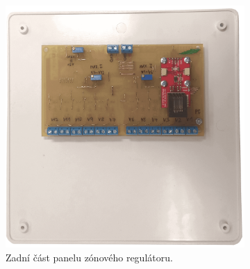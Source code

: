 


\begin{figure}[H]
\centering
\begin{subfigure}{.5\textwidth}
  \centering
  \includegraphics[width=\textwidth]{images/zonovy-regulator/zonovy-regulator-spodni-strana.png}
  \caption{Zadní část panelu zónového regulátoru. \newline \newline}
  \label{fig:zonovy-regulator-spodni-strana}
\end{subfigure}%
\begin{subfigure}{.5\textwidth}
  \centering

\end{subfigure}
\end{figure}
